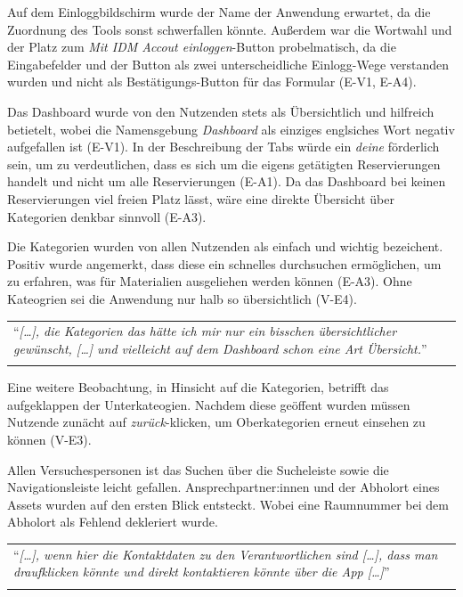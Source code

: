 Auf dem Einloggbildschirm wurde der Name der Anwendung erwartet, da die Zuordnung des Tools sonst
schwerfallen könnte. Außerdem war die Wortwahl und der Platz zum \textit{Mit IDM Accout
einloggen}-Button probelmatisch, da die Eingabefelder und der Button als zwei unterscheidliche
Einlogg-Wege verstanden wurden und nicht als Bestätigungs-Button für das Formular (E-V1, E-A4).

Das Dashboard wurde von den Nutzenden stets als Übersichtlich und hilfreich betietelt, wobei die
Namensgebung \textit{Dashboard} als einziges englsiches Wort negativ aufgefallen ist (E-V1). In der
Beschreibung der Tabs würde ein \textit{deine} förderlich sein, um zu verdeutlichen, dass es sich um
die eigens getätigten Reservierungen handelt und nicht um alle Reservierungen (E-A1). Da das
Dashboard bei keinen Reservierungen viel freien Platz lässt, wäre eine direkte Übersicht über
Kategorien denkbar sinnvoll (E-A3). 

Die Kategorien wurden von allen Nutzenden als einfach und wichtig bezeichent. Positiv wurde
angemerkt, dass diese ein schnelles durchsuchen ermöglichen, um zu erfahren, was für Materialien
ausgeliehen werden können (E-A3). Ohne Kateogrien sei die Anwendung nur halb so übersichtlich
(V-E4).

\begin{longtable}{p{}} \arrayrulecolor{maincolor}\hline
  \enquote{\textit{[\dots], die Kategorien das hätte ich mir nur ein bisschen übersichtlicher
  gewünscht, [\dots] und vielleicht auf dem Dashboard schon eine Art Übersicht.}} \\
  \arrayrulecolor{maincolor}\hline
\end{longtable}

Eine weitere Beobachtung, in Hinsicht auf die Kategorien, betrifft das aufgeklappen der
Unterkateogien. Nachdem diese geöffent wurden müssen Nutzende zunächt auf \textit{zurück}-klicken,
um Oberkategorien erneut einsehen zu können (V-E3). 

Allen Versuchespersonen ist das Suchen über die Sucheleiste sowie die Navigationsleiste leicht
gefallen. Ansprechpartner:innen und der Abholort eines Assets wurden auf den ersten Blick entsteckt.
Wobei eine Raumnummer bei dem Abholort als Fehlend dekleriert wurde. 

\begin{longtable}{p{}} \arrayrulecolor{maincolor}\hline
  \enquote{\textit{[\dots], wenn hier die Kontaktdaten zu den Verantwortlichen sind [\dots], dass
    man draufklicken könnte und direkt kontaktieren könnte über die App [\dots]}} \\
  \arrayrulecolor{maincolor}\hline
\end{longtable}

